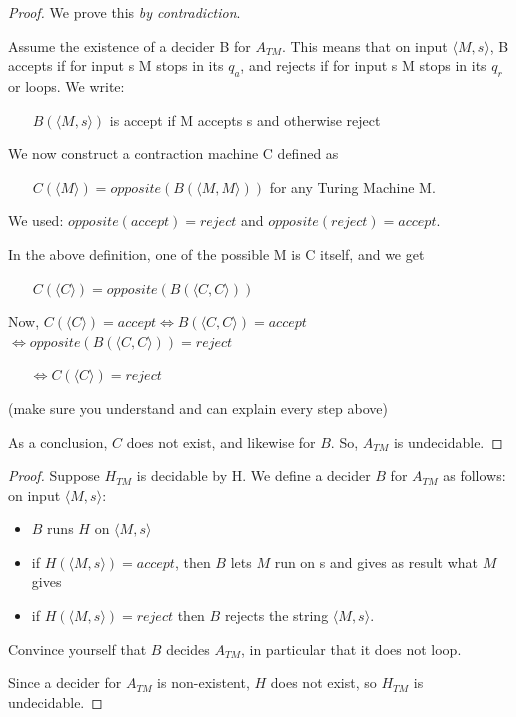 \begin{proof}
We prove this {\em by contradiction}.


Assume the existence of a decider B for $A_{TM}$. This means that on
input $\langle M,s \rangle$, B accepts if for input s M stops in its
$q_a$, and rejects if for input s M stops in its $q_r$ or loops. We
write:

$~~~~~~~~B(\langle M,s \rangle)$ is accept if M accepts s and otherwise reject

We now construct a contraction machine C defined as

$~~~~~~~~C(\langle M \rangle) = opposite(B(\langle M,M \rangle))$ for
any Turing Machine M.

We used: 
$opposite(accept) = reject$ and $opposite(reject) = accept$.


In the above definition, one of the possible M is C itself, and we get


$~~~~~~~~C(\langle C \rangle) = opposite(B(\langle C,C \rangle))$


Now,  $C(\langle C \rangle) = accept \Leftrightarrow B(\langle C,C \rangle)
= accept$
% 
$ \Leftrightarrow opposite(B(\langle C,C \rangle)) = reject$

$~~~~~~~ \Leftrightarrow C(\langle C \rangle) = reject$ 

(make sure you understand and can explain every step above)

As a conclusion, $C$ does not exist, and likewise for $B$. So,
$A_{TM}$ is undecidable.
\end{proof}

\newpage
\begin{proof}
Suppose $H_{TM}$ is decidable by H. We define a decider $B$ for
$A_{TM}$ as follows: on input $\langle M,s \rangle$:
\begin{itemize}
\item $B$ runs $H$ on $\langle M,s \rangle$
\item if $H(\langle M,s \rangle) = accept$, then $B$ lets $M$ run on s
  and gives as result what $M$ gives
\item if $H(\langle M,s \rangle) = reject$ then $B$ rejects the string
  $\langle M,s \rangle$.
\end{itemize}
Convince yourself that $B$ decides $A_{TM}$, in particular that it
does not loop.

Since a decider for $A_{TM}$ is non-existent, $H$ does not exist, so
$H_{TM}$ is undecidable.
\end{proof}

